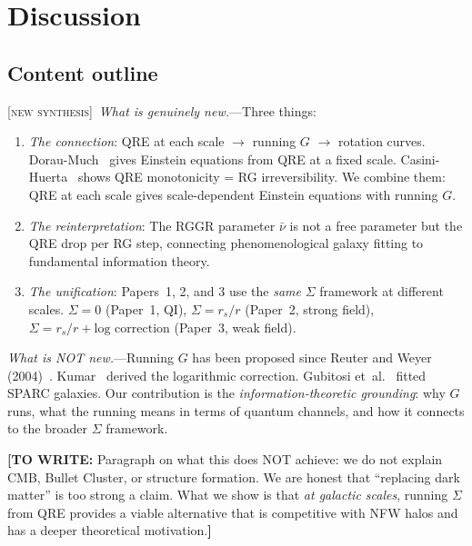 \documentclass[prl,twocolumn,superscriptaddress,longbibliography,floatfix]{revtex4-2}
\newcommand{\newsyn}{\textsc{[new synthesis]}}
\newcommand{\towrite}[1]{{\color{blue}\textbf{[TO WRITE:} #1\textbf{]}}}
\begin{document}
\section{Discussion}
\label{sec:discussion}

\subsection*{Content outline}

\newsyn\ \emph{What is genuinely new.}---Three things:
\begin{enumerate}
\item \emph{The connection}: QRE at each scale $\to$ running $G$
  $\to$ rotation curves. Dorau-Much~\cite{DorauMuch2025} gives
  Einstein equations from QRE at a fixed scale. Casini-Huerta~\cite{CasiniHuerta2017}
  shows QRE monotonicity = RG irreversibility. We combine them:
  QRE at each scale gives scale-dependent Einstein equations
  with running $G$.
\item \emph{The reinterpretation}: The RGGR parameter $\bar{\nu}$
  is not a free parameter but the QRE drop per RG step, connecting
  phenomenological galaxy fitting to fundamental information theory.
\item \emph{The unification}: Papers~1, 2, and 3 use the \emph{same}
  $\Sigma$ framework at different scales. $\Sigma = 0$ (Paper~1,
  QI), $\Sigma = r_s/r$ (Paper~2, strong field),
  $\Sigma = r_s/r + \text{log correction}$ (Paper~3, weak field).
\end{enumerate}

\emph{What is NOT new.}---Running $G$ has been proposed since
Reuter and Weyer (2004)~\cite{ReuterWeyer2004}. Kumar~\cite{Kumar2025}
derived the logarithmic correction. Gubitosi et~al.~\cite{Gubitosi2024}
fitted SPARC galaxies. Our contribution is the
\emph{information-theoretic grounding}: why $G$ runs, what the
running means in terms of quantum channels, and how it connects
to the broader $\Sigma$ framework.

\towrite{Paragraph on what this does NOT achieve: we do not explain
CMB, Bullet Cluster, or structure formation. We are honest that
``replacing dark matter'' is too strong a claim. What we show is
that \emph{at galactic scales}, running $\Sigma$ from QRE provides
a viable alternative that is competitive with NFW halos and has
a deeper theoretical motivation.}
\end{document}
